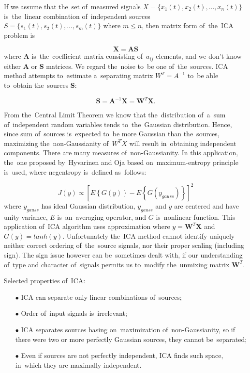 If we assume that the~set of~measured signals $X=\{x_1(t), x_2(t),\dots,x_n(t)\}$ is~the~linear combination of~independent sources $S=\{s_1(t), s_2(t),\dots,s_m(t)\}$ where $m≤n$, then matrix form of~the~ICA problem is

\begin{equation}
  \mathbf{X}=\mathbf{AS}
\end{equation}
where \textbf{A} is~the~coefficient matrix consisting of~$a_{ij}$ elements, and we don’t know either \textbf{A} or \textbf{S} matrices. We regard the~noise to~be one of~the~sources. ICA method attempts to~estimate a~separating matrix $W^T = A^{-1}$ to~be able to~obtain the~sources \textbf{S}:

\begin{equation}
  \mathbf{S}=\mathbf{A}^{-1}\mathbf{X}=\mathbf{W}^T\mathbf{X}.
\end{equation}

From the~Central Limit Theorem we know that the~distribution of~a~sum of~independent random variables tends to~the~Gaussian distribution. Hence, since sum of~sources is~expected to~be more Gaussian than the~sources, maximizing the~non-Gaussianity of~$W^TX$ will result in~obtaining independent components. There are many measures of~non-Gaussianity. In this application, the~one proposed by~Hyvarinen and Oja \cite{hyvarinen2000independent} based on~maximum-entropy principle is~used, where negentropy is~defined as~follows:

\begin{equation}
  J(y)\propto\left[E\left\{G(y)\right\} -E\left\{G(y_{gauss})\right\}\right]^2
\end{equation}
where $y_{gauss}$ has ideal Gaussian distribution, $y_{gauss}$ and $y$ are centered and have unity variance, $E{}$ is~an~averaging operator, and $G$ is~nonlinear function. This application of~ICA algorithm uses approximation where $y = \mathbf{W}^T\mathbf{X}$ and $G(y) = tanh(y)$. Unfortunately the~ICA method cannot identify uniquely neither correct ordering of~the~source signals, nor their proper scaling (including sign). The sign issue however can be~sometimes dealt with, if our understanding of~type and character of~signals permits us to~modify the~unmixing matrix $\mathbf{W}^T$.

Selected properties of~ICA:
\begin{itemize}
  \item[$\bullet$] ICA can separate only linear combinations of~sources;
  \item[$\bullet$] Order of~input signals is~irrelevant;
  \item[$\bullet$] ICA separates sources basing on~maximization of~non-Gaussianity, so if there were two or more perfectly Gaussian sources, they cannot be~separated;
  \item[$\bullet$] Even if sources are not perfectly independent, ICA finds such space, in~which they are maximally independent.
\end{itemize}

